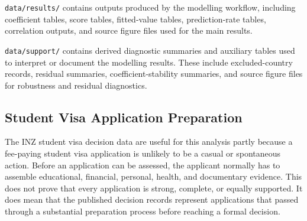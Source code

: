 \documentclass[runningheads]{llncs}
\begin{document}
\texttt{data/results/} contains outputs produced by the modelling workflow, including coefficient tables, score tables, fitted-value tables, prediction-rate tables, correlation outputs, and source figure files used for the main results.

\texttt{data/support/} contains derived diagnostic summaries and auxiliary tables used to interpret or document the modelling results. These include excluded-country records, residual summaries, coefficient-stability summaries, and source figure files for robustness and residual diagnostics.

\subsection{Student Visa Application Preparation}
\label{app:student-visa-preparation}

The INZ student visa decision data are useful for this analysis partly because a fee-paying student visa application is unlikely to be a casual or spontaneous action. Before an application can be assessed, the applicant normally has to assemble educational, financial, personal, health, and documentary evidence. This does not prove that every application is strong, complete, or equally supported. It does mean that the published decision records represent applications that passed through a substantial preparation process before reaching a formal decision.
\end{document}
